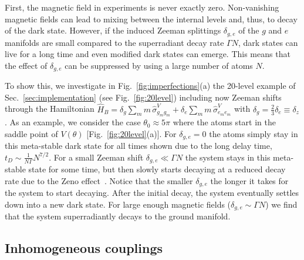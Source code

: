 \documentclass[aps,prx,superscriptaddress,twocolumn,notitlepage,nofootinbib,longbibliography]{revtex4-2}
\begin{document}
First, the magnetic field in experiments is never exactly zero. Non-vanishing magnetic fields can lead to mixing between the internal levels and, thus, to decay of the dark state. However, if the induced Zeeman splittings $\delta_{g,e}$ of the $g$ and $e$ manifolds are small compared to the superradiant decay rate $\Gamma N$, dark states can live for a long time and even modified dark states can emerge.
This means that the effect of $\delta_{g,e}$ can be suppressed by using a large number of atoms $N$.

To show this, we investigate in Fig.~\ref{fig:imperfections}(a) the 20-level example of Sec.~\ref{sec:implementation} (see Fig.~\ref{fig:20level}) including now Zeeman shifts through the Hamiltonian $\hat{H}_B = \delta_g \sum_m m\, \hat{\sigma}^V_{g_mg_m} + \delta_e \sum_m m\, \hat{\sigma}^V_{e_me_m}$ with $\delta_g=\frac{2}{3}\delta_e\equiv \delta_z$.
As an example, we consider the case $\theta_0\approx 5\pi$ where the atoms start in the saddle point of $V(\theta)$ [Fig.~\ref{fig:20level}(a)].
For $\delta_{g,e}=0$ the atoms simply stay in this meta-stable dark state for all times shown due to the long delay time, $t_D\sim \frac{1}{N\Gamma} N^{7/2}$.
For a small Zeeman shift $\delta_{g,e}\ll \Gamma N$ the system stays in this meta-stable state for some time, but then slowly starts decaying at a reduced decay rate due to the Zeno effect~\cite{WinelandItano_PRA1990}.
Notice that the smaller $\delta_{g,e}$ the longer it takes for the system to start decaying.
After the initial decay, the system eventually settles down into a new dark state.
For large enough magnetic fields ($\delta_{g,e}\sim \Gamma N$) we find that the system superradiantly decays to the ground manifold.






\subsection{Inhomogeneous couplings}
\end{document}
